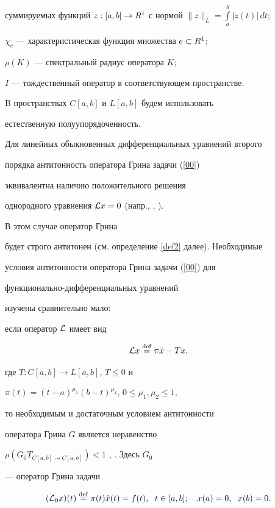суммируемых функций $z:[a,b]\to


\R$ с нормой $\|z\|_L=\int\limits_a^b|z(t)|\,dt;$


$\chi_e$ --- характеристическая функция множества $e\subset{R}^1$;


$\rho(K)$ --- спектральный радиус оператора $K$;


$I$ --- тождественный оператор в соответствующем пространстве.





B пространствах $C[a,b]$ и $L[a,b]$ будем использовать


естественную полуупорядоченность.





Для линейных обыкновенных дифференциальных уравнений второго


порядка антитонность оператора Грина задачи (\ref{00})


эквивалентна наличию положительного решения


однородного уравнения ${\cal L} x=0$ (напр., \cite{H}, \cite{AD0}).


В этом случае оператор Грина


будет строго антитонен (см. определение \ref{def2} далее). Необходимые


условия антитонности оператора Грина задачи (\ref{00}) для


функционально-дифференциальных уравнений


изучены сравнительно мало:


если оператор ${\cal L}$ имеет вид


$$


\L x\df\pi \Ddot x - Tx,


$$


где $T: C[a,b]\to L[a,b]$, $T\le0$ и


$\pi(t)=(t-a)^{\mu_1}(b-t)^{\mu_2}$, $0\le\mu_1,\mu_2\le1$,


то необходимым и достаточным условием антитонности


оператора Грина $G$ является неравенство


$\rho(G_0T_{C[a,b]\to C[a,b]})<1$ \cite{AMR}, \cite{Lab}. Здесь $G_0$


--- оператор Грина задачи


\begin{equation}


\label{0}


(\L_0x)(t)\df\pi(t) \Ddot x(t)=f(t),\ \; t\in[a,b];\quad


x(a)=0,\ \; x(b)=0.


\end{equation}


